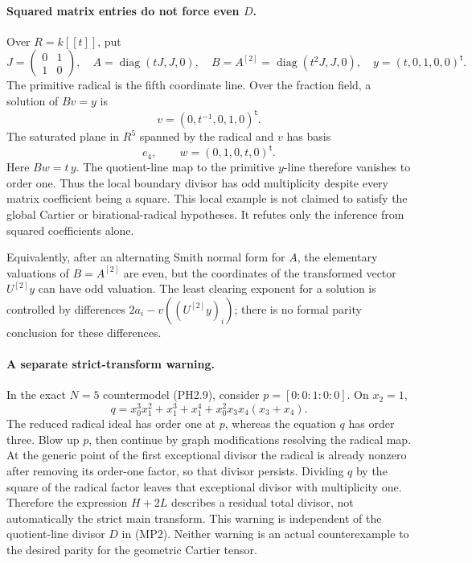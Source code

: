 \paragraph{Squared matrix entries do not force even \(D\).}
Over \(R=k[[t]]\), put
\[
 J=\begin{pmatrix}0&1\\1&0\end{pmatrix},\quad
 A=\operatorname{diag}(tJ,J,0),\quad
 B=A^{[2]}=\operatorname{diag}(t^2J,J,0),\quad
 y=(t,0,1,0,0)^{\mathsf t}.
\]
The primitive radical is the fifth coordinate line.
Over the fraction field, a solution of \(Bv=y\) is
\[
          v=(0,t^{-1},0,1,0)^{\mathsf t}.
\]
The saturated plane in \(R^5\) spanned by the radical and \(v\)
has basis
\[
          e_4,\qquad w=(0,1,0,t,0)^{\mathsf t}.
\]
Here \(Bw=t\,y\).  The quotient-line map to the primitive
\(y\)-line therefore vanishes to order one.  Thus the local
boundary divisor has odd multiplicity despite every matrix
coefficient being a square.  This local example is not claimed
to satisfy the global Cartier or birational-radical hypotheses.
It refutes only the inference from squared coefficients alone.

Equivalently, after an alternating Smith normal form for \(A\),
the elementary valuations of \(B=A^{[2]}\) are even, but the
coordinates of the transformed vector \(U^{[2]}y\) can have odd
valuation.  The least clearing exponent for a solution is
controlled by differences \(2a_i-v((U^{[2]}y)_i)\); there is no
formal parity conclusion for these differences.

\paragraph{A separate strict-transform warning.}
In the exact \(N=5\) countermodel (PH2.9), consider
\(p=[0:0:1:0:0]\).  On \(x_2=1\),
\[
 q=x_0^3x_1^2+x_1^3+x_1^4+x_0^2x_3x_4(x_3+x_4).
\]
The reduced radical ideal has order one at \(p\), whereas
the equation \(q\) has order three.  Blow up \(p\), then
continue by graph modifications resolving the radical map.
At the generic point of the first exceptional divisor the
radical is already nonzero after removing its order-one factor,
so that divisor persists.  Dividing \(q\) by the square of the
radical factor leaves that exceptional divisor with multiplicity
one.  Therefore the expression \(H+2L\) describes a residual
total divisor, not automatically the strict main transform.
This warning is independent of the quotient-line divisor \(D\)
in (MP2).  Neither warning is an actual counterexample to the
desired parity for the geometric Cartier tensor.
